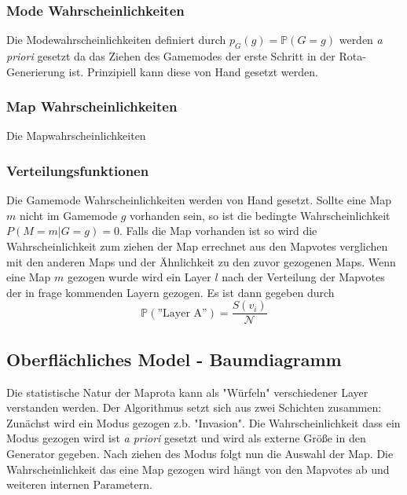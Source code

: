         \subsubsection{Mode Wahrscheinlichkeiten}
            Die Modewahrscheinlichkeiten definiert durch $p_G(g)=\mathbb{P}(G=g)$ werden \textit{a priori} gesetzt da das Ziehen des Gamemodes der erste Schritt in der Rota-Generierung ist.
            Prinzipiell kann diese von Hand gesetzt werden. 
        \subsubsection{Map Wahrscheinlichkeiten}
            Die Mapwahrscheinlichkeiten              
        \subsubsection{Verteilungsfunktionen}
        Die Gamemode Wahrscheinlichkeiten werden von Hand gesetzt. 
        Sollte eine Map $m$ nicht im Gamemode $g$ vorhanden sein, so ist die bedingte Wahrscheinlichkeit $P(M=m|G=g) = 0$. 
        Falls die Map vorhanden ist so wird die Wahrscheinlichkeit zum ziehen der Map errechnet aus den Mapvotes verglichen mit den anderen Maps und der Ähnlichkeit zu den zuvor gezogenen Maps.
        Wenn eine Map $m$ gezogen wurde wird ein Layer $l$ nach der Verteilung der Mapvotes der in frage kommenden Layern gezogen. 
        Es ist dann gegeben durch 
        \begin{equation}
            \mathbb{P}(\text{''Layer A''}) = \frac{S(v_i)}{\mathcal{N}}
        \end{equation}
    \subsection{Oberflächliches Model - Baumdiagramm}
        Die statistische Natur der Maprota kann als "Würfeln" verschiedener Layer verstanden werden. 
        Der Algorithmus setzt sich aus zwei Schichten zusammen: Zunächst wird ein Modus gezogen z.b. "Invasion". 
        Die Wahrscheinlichkeit dass ein Modus gezogen wird ist \textit{a priori} gesetzt und wird als externe Größe in den Generator gegeben.
        Nach ziehen des Modus folgt nun die Auswahl der Map. 
        Die Wahrscheinlichkeit das eine Map gezogen wird hängt von den Mapvotes ab und weiteren internen Parametern. 

